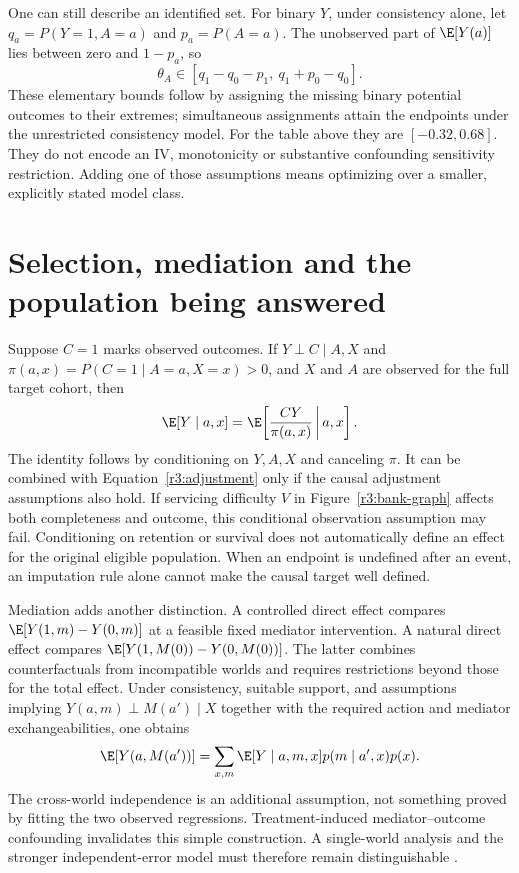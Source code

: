 One can still describe an identified set. For binary $Y$, under consistency
alone, let $q_a=P(Y=1,A=a)$ and $p_a=P(A=a)$. The unobserved part of
$\E[Y(a)]$ lies between zero and $1-p_a$, so
\begin{equation}
 \theta_A\in[q_1-q_0-p_1,\ q_1+p_0-q_0].
 \label{r3:consistency-bounds}
\end{equation}
These elementary bounds follow by assigning the missing binary potential
outcomes to their extremes; simultaneous assignments attain the endpoints
under the unrestricted consistency model. For the table above they are
$[-0.32,0.68]$. They do not encode an IV, monotonicity or substantive
confounding sensitivity restriction. Adding one of those assumptions means
optimizing over a smaller, explicitly stated model class.

\section{Selection, mediation and the population being answered}
Suppose $C=1$ marks observed outcomes. If $Y\perp C\mid A,X$ and
$\pi(a,x)=P(C=1\mid A=a,X=x)>0$, and $X$ and $A$ are observed for the
full target cohort, then
\[
 \E[Y\mid a,x]=\E\!\left[\frac{CY}{\pi(a,x)}\,\middle|\,a,x\right].
\]
The identity follows by conditioning on $Y,A,X$ and canceling $\pi$.
It can be combined with Equation~\eqref{r3:adjustment} only if the causal
adjustment assumptions also hold. If servicing difficulty $V$ in
Figure~\ref{r3:bank-graph} affects both completeness and outcome, this
conditional observation assumption may fail. Conditioning on retention
or survival does not automatically define an effect for the original
eligible population. When an endpoint is undefined after an event, an
imputation rule alone cannot make the causal target well defined.

Mediation adds another distinction. A controlled direct effect compares
$\E[Y(1,m)-Y(0,m)]$ at a feasible fixed mediator intervention. A natural
direct effect compares $\E[Y(1,M(0))-Y(0,M(0))]$. The latter combines
counterfactuals from incompatible worlds and requires restrictions beyond
those for the total effect. Under consistency, suitable support, and
assumptions implying $Y(a,m)\perp M(a')\mid X$ together with the
required action and mediator exchangeabilities, one obtains
\[
 \E[Y(a,M(a'))]
 =\sum_{x,m}\E[Y\mid a,m,x]p(m\mid a',x)p(x).
\]
The cross-world independence is an additional assumption, not something
proved by fitting the two observed regressions. Treatment-induced
mediator--outcome confounding invalidates this simple construction. A
single-world analysis and the stronger independent-error model must
therefore remain distinguishable \citep{swig2013}.

